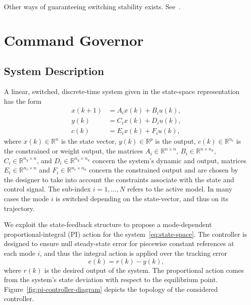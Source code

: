 Other ways of guaranteeing switching stability exists.
See~\textcite{geromel.deaecto:stability,liberzon.morse:basic,geromel.colaneri:stabilization}.

\section{Command Governor}%
\label{sec:command-governor}

\subsection{System Description}%
\label{subsec:system-description}

A linear, switched, discrete-time system given in the state-space representation has the form
%
\begin{equation}
  \label{eq:state-space}
  \begin{aligned}
    x(k+1) & = A_{i}x(k)+B_{i}u(k), \\
    y(k)   & = C_{i}x(k)+D_{i}u(k), \\
    c(k)   & = E_{i}x(k)+F_{i}u(k),
  \end{aligned}
\end{equation}
%
where \(x(k)\in\mathbb{R}^n\) is the state vector, \(y(k)\in\mathbb{R}^p\) is the
output, \(c(k)\in\mathbb{R}^{n_c}\) is the constrained or weight output, the
matrices \(A_{i}\in\mathbb{R}^{n\times{}n}\), \(B_{i}\in\mathbb{R}^{n\times{}n_u}\),
\(C_{i}\in\mathbb{R}^{n_y\times{}n}\), and \(D_{i}\in\mathbb{R}^{n_y\times{}n_u}\) concern the
system's dynamic and output, matrices \(E_{i}\in\mathbb{R}^{n_c\times{}n}\) and
\(F_{i}\in\mathbb{R}^{n_c\times{}n_u}\) concern the constrained output and are chosen
by the designer to take into account the constraints associate with the state
and control signal. The sub-index \(i = 1,\ldots,N\) refers to the active model. In
many cases the mode \(i\) is switched depending on the state-vector, and thus on
its trajectory.

We exploit the state-feedback structure to propose a mode-dependent
proportional-integral (PI) action for the system~\eqref{eq:state-space}. The
controller is designed to ensure null steady-state error for piecewise constant
references at each mode \(i\), and thus the integral action is applied over the
tracking error~\parencite{lopes.leite.ea:anti-windup}
%
\begin{equation}
  \label{eq:r-y-error}
  e(k) = r(k)-y(k),
\end{equation}
%
where \(r(k)\) is the desired output of the system. The proportional action
comes from the system's state deviation with respect to the equilibrium point.
Figure~\ref{fig:pi-controller-diagram} depicts the topology of the considered
controller.

